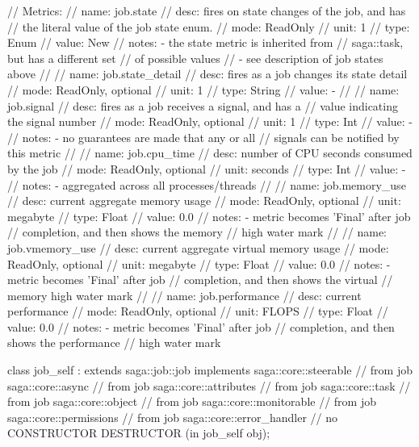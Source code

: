 \begin{myspec}
{{ 
      // Metrics:
      //   name:  job.state
      //   desc:  fires on state changes of the job, and has 
      //          the literal value of the job state enum.
      //   mode:  ReadOnly
      //   unit:  1
      //   type:  Enum
      //   value: New
      //   notes: - the state metric is inherited from
      //            saga::task, but has a different set
      //            of possible values
      //          - see description of job states above
      // 
      //   name:  job.state_detail
      //   desc:  fires as a job changes its state detail
      //   mode:  ReadOnly, optional
      //   unit:  1
      //   type:  String
      //   value: -
      // 
      //   name:  job.signal
      //   desc:  fires as a job receives a signal, and has a
      //          value indicating the signal number
      //   mode:  ReadOnly, optional
      //   unit:  1
      //   type:  Int
      //   value: -
      //   notes: - no guarantees are made that any or all
      //            signals can be notified by this metric
      // 
      //   name:  job.cpu_time
      //   desc:  number of CPU seconds consumed by the job
      //   mode:  ReadOnly, optional
      //   unit:  seconds
      //   type:  Int
      //   value: -
      //   notes: - aggregated across all processes/threads
      // 
      //   name:  job.memory_use
      //   desc:  current aggregate memory usage
      //   mode:  ReadOnly, optional
      //   unit:  megabyte
      //   type:  Float
      //   value: 0.0
      //   notes: - metric becomes 'Final' after job 
      //            completion, and then shows the memory 
      //            high water mark
      // 
      //   name:  job.vmemory_use
      //   desc:  current aggregate virtual memory usage
      //   mode:  ReadOnly, optional
      //   unit:  megabyte
      //   type:  Float
      //   value: 0.0
      //   notes: - metric becomes 'Final' after job 
      //            completion, and then shows the virtual 
      //            memory high water mark
      // 
      //   name:  job.performance
      //   desc:  current performance
      //   mode:  ReadOnly, optional
      //   unit:  FLOPS
      //   type:  Float
      //   value: 0.0
      //   notes: - metric becomes 'Final' after job 
      //            completion, and then shows the performance
      //            high water mark
    }
 
 
    class job_self : extends     saga::job::job
                     implements  saga::core::steerable
                  // from job    saga::core::async
                  // from job    saga::core::attributes
                  // from job    saga::core::task
                  // from job    saga::core::object
                  // from job    saga::core::monitorable
                  // from job    saga::core::permissions
                  // from job    saga::core::error_handler
    {
      // no CONSTRUCTOR
      DESTRUCTOR           (in  job_self        obj);
    }
  }
 \end{myspec}
 

